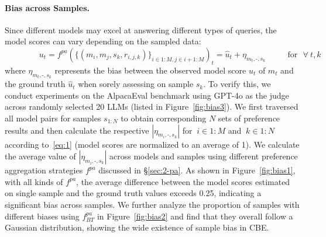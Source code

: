 \paragraph{Bias across Samples.} Since different models may excel at answering different types of queries, the model scores can vary depending on the sampled data:
\begin{equation}
    \ \ \ \ \ \ \ \ \ \ \ \ \ \ \ \ \ \ \ u_t=f^{pa}(\{(m_i,m_j,s_k,r_{i,j,k})\}_{i\in 1:M,j\in i+1:M})_t = \hat{u}_t + \eta_{m_t,\text{-},s_k} \ \ \ \ \ \ \ \ \ \ \ \ \text{for} \ \ \ \forall \  t,k
    \label{eq:1}
\end{equation}
where $\eta_{m_t,\text{-},s_k}$ represents the bias between the observed model score $u_t$ of $m_t$ and the ground truth $\hat{u}_t$ when sorely assessing on sample $s_k$.
To verify this, we conduct experiments on the AlpacaEval benchmark \citep{alpacaeval} using GPT-4o \citep{4o} as the judge across randomly selected 20 LLMs (listed in Figure~\ref{fig:bias3}). We first traversed all model pairs for samples $s_{1:N}$ to obtain corresponding $N$ sets of preference results and then calculate the respective $|\eta_{m_i,\text{-},s_k}|$ for $\ i\in 1:M$ and $\ k\in 1:N$ according to~\eqref{eq:1} (model scores are normalized to an average of 1). We calculate the average value of $|\eta_{m_i,\text{-},s_k}|$ across models and samples using different preference aggregation strategies $f^{pa}$ discussed in \S\ref{sec:2-pa}. As shown in Figure~\ref{fig:bias1}, with all kinds of $f^{pa}$, the average difference between the model scores estimated on single sample and the ground truth values exceeds 0.25, indicating a significant bias across samples. We further analyze the proportion of samples with different biases using $f^{pa}_{BT}$ in Figure~\ref{fig:bias2} and find that they overall follow a Gaussian distribution, showing the wide existence of sample bias in CBE.
